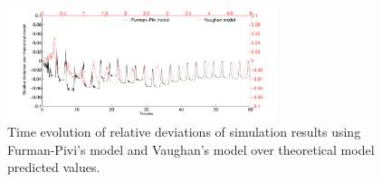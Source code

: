 \documentclass[aps,prstab,superscriptaddress,showpacs]{revtex4-1}
\begin{document}
\begin{figure}[H]
\begin{center}
\includegraphics[width=0.7\textwidth]{figures/models_comp.pdf}
\end{center}
\caption{Time evolution of relative deviations of simulation results using Furman-Pivi's model and Vaughan's model over theoretical model predicted values.\label{fig:de}}
\end{figure}
\end{document}
